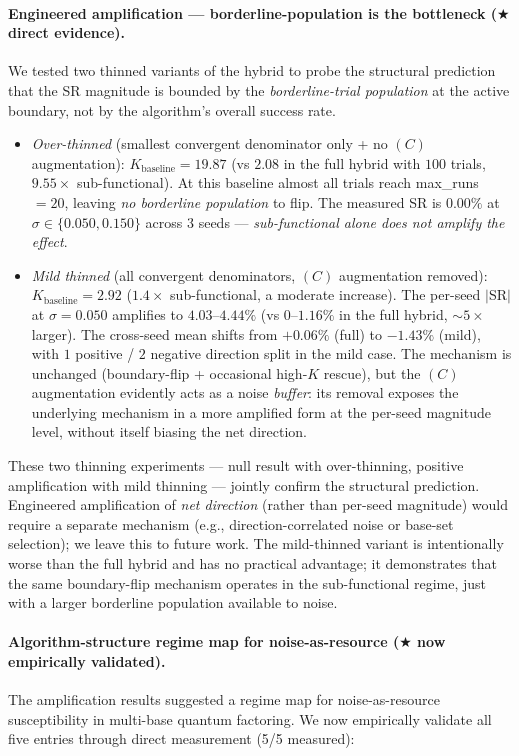 \documentclass[11pt]{article}
\begin{document}
\paragraph{Engineered amplification --- borderline-population is the bottleneck ($\bigstar$ direct evidence).}
We tested two thinned variants of the hybrid to probe the structural prediction that the SR magnitude is bounded by the \emph{borderline-trial population} at the active boundary, not by the algorithm's overall success rate.
\begin{itemize}
  \item \emph{Over-thinned} (smallest convergent denominator only + no $(C)$ augmentation): $K_{\text{baseline}} = 19.87$ (vs $2.08$ in the full hybrid with $100$ trials, $9.55\times$ sub-functional). At this baseline almost all trials reach max\_runs $= 20$, leaving \emph{no borderline population} to flip. The measured SR is $0.00\%$ at $\sigma \in \{0.050, 0.150\}$ across $3$ seeds --- \emph{sub-functional alone does not amplify the effect}.
  \item \emph{Mild thinned} (all convergent denominators, $(C)$ augmentation removed): $K_{\text{baseline}} = 2.92$ ($1.4\times$ sub-functional, a moderate increase). The per-seed $|$SR$|$ at $\sigma = 0.050$ amplifies to $4.03$--$4.44\%$ (vs $0$--$1.16\%$ in the full hybrid, $\sim 5\times$ larger). The cross-seed mean shifts from $+0.06\%$ (full) to $-1.43\%$ (mild), with $1$ positive / $2$ negative direction split in the mild case. The mechanism is unchanged (boundary-flip + occasional high-$K$ rescue), but the $(C)$ augmentation evidently acts as a noise \emph{buffer}: its removal exposes the underlying mechanism in a more amplified form at the per-seed magnitude level, without itself biasing the net direction.
\end{itemize}
These two thinning experiments --- null result with over-thinning, positive amplification with mild thinning --- jointly confirm the structural prediction. Engineered amplification of \emph{net direction} (rather than per-seed magnitude) would require a separate mechanism (e.g., direction-correlated noise or base-set selection); we leave this to future work. The mild-thinned variant is intentionally worse than the full hybrid and has no practical advantage; it demonstrates that the same boundary-flip mechanism operates in the sub-functional regime, just with a larger borderline population available to noise.

\paragraph{Algorithm-structure regime map for noise-as-resource ($\bigstar$ now empirically validated).}
The amplification results suggested a regime map for noise-as-resource susceptibility in multi-base quantum factoring. We now empirically validate all five entries through direct measurement (5/5 measured):
\end{document}
